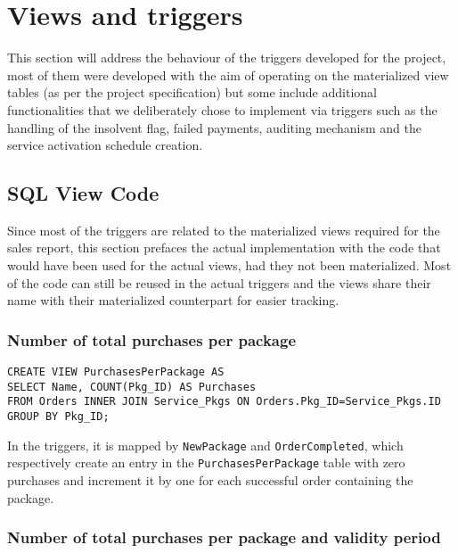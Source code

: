 
\chapter{Views and triggers}
\label{chap:views_triggers}

This section will address the behaviour of the triggers developed for the project, most of them were developed with the aim of operating on the materialized view tables (as per the project specification) but some include additional functionalities that we deliberately chose to implement via triggers such as the handling of the insolvent flag, failed payments, auditing mechanism and the service activation schedule creation.


\section{SQL View Code}
\label{sec:sql_views}

Since most of the triggers are related to the materialized views required for the sales report, this section prefaces the actual implementation with the code that would have been used for the actual views, had they not been materialized. Most of the code can still be reused in the actual triggers and the views share their name with their materialized counterpart for easier tracking.

\subsection{Number of total purchases per package}

\begin{lstlisting}[style=SQL]
CREATE VIEW PurchasesPerPackage AS
SELECT Name, COUNT(Pkg_ID) AS Purchases
FROM Orders INNER JOIN Service_Pkgs ON Orders.Pkg_ID=Service_Pkgs.ID
GROUP BY Pkg_ID;
\end{lstlisting}

In the triggers, it is mapped by \texttt{NewPackage} and \texttt{OrderCompleted}, which respectively create an entry in the \texttt{PurchasesPerPackage} table with zero purchases and increment it by one for each successful order containing the package.

\subsection{Number of total purchases per package and validity period}

